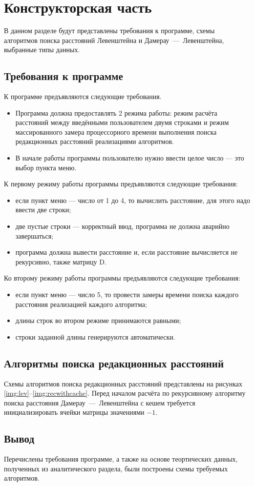 \chapter{Конструкторская часть}
В данном разделе будут представлены требования к программе, схемы алгоритмов поиска расстояний Левенштейна и Дамерау~---~Левенштейна, выбранные типы данных.


\section{Требования к программе}
К программе предъявляются следующие требования.
\begin{itemize}
\item Программа должна предоставлять 2 режима работы: режим расчёта расстояний между введёнными пользователем двумя строками и режим массированного замера процессорного времени выполнения поиска редакционных расстояний реализациями алгоритмов.
\item В начале работы программы пользователю нужно ввести целое число --- это выбор пункта меню.
\end{itemize}

К первому режиму работы программы предъявляются следующие требования:
\begin{itemize}
	\item если пункт меню --- число от 1 до 4, то вычислить расстояние, для этого надо ввести две строки;
	\item две пустые строки --- корректный ввод, программа не должна аварийно завершаться;
	\item программа должна вывести расстояние и, если расстояние вычисляется не рекурсивно, также матрицу D.
\end{itemize}

Ко второму режиму работы программы предъявляются следующие требования:
\begin{itemize}
	\item если пункт меню --- число 5, то провести замеры времени поиска каждого расстояния реализацией каждого алгоритма;
	\item длины строк во втором режиме принимаются равными;
	\item строки заданной длины генерируются автоматически.
\end{itemize}


\section{Алгоритмы поиска редакционных расстояний}
Схемы алгоритмов поиска редакционных расстояний представлены на рисунках  \ref{img:lev}--\ref{img:recwithcache}. Перед началом расчёта по рекурсивному алгоритму поиска расстояния Дамерау~---~Левенштейна с кешем требуется инициализировать ячейки матрицы значениями $-1$.
\clearpage

\section*{Вывод}
Перечислены требования программе, а также на основе теортических данных, полученных из аналитического раздела, были построены схемы требуемых алгоритмов.
